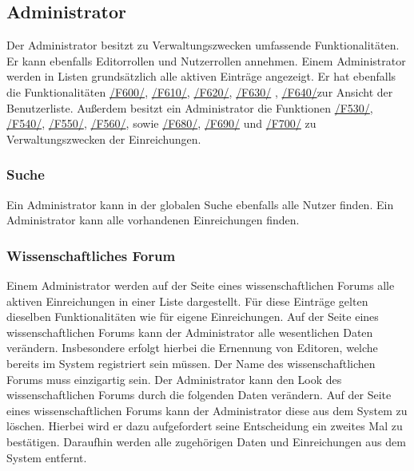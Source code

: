 \subsection{Administrator}
Der Administrator besitzt zu Verwaltungszwecken umfassende Funktionalitäten. Er kann ebenfalls Editorrollen und Nutzerrollen annehmen.
Einem Administrator werden in Listen grundsätzlich alle aktiven Einträge angezeigt. Er hat ebenfalls die Funktionalitäten
\hyperref[funkt:600]{/F600/}, \hyperref[funkt:610]{/F610/}, \hyperref[funkt:620]{/F620/}, \hyperref[funkt:630]{/F630/}
, \hyperref[funkt:640]{/F640/}zur Ansicht der Benutzerliste.
Außerdem besitzt ein Administrator die Funktionen \hyperref[funkt:530]{/F530/}, \hyperref[funkt:540]{/F540/},
\hyperref[funkt:550]{/F550/}, \hyperref[funkt:560]{/F560/}, sowie \hyperref[funkt:680]{/F680/}, \hyperref[funkt:690]{/F690/} und
\hyperref[funkt:700]{/F700/}
zu Verwaltungszwecken der Einreichungen.

\subsubsection{Suche}
\begin{description}
     Ein Administrator kann in der globalen Suche ebenfalls alle Nutzer finden.
     Ein Administrator kann alle vorhandenen Einreichungen finden.
\end{description}

\subsubsection{Wissenschaftliches Forum}
\begin{description}
     Einem Administrator werden auf der Seite eines wissenschaftlichen Forums
    alle aktiven Einreichungen in einer Liste dargestellt.
    Für diese Einträge gelten dieselben Funktionalitäten wie für eigene Einreichungen. %
     Auf der Seite eines wissenschaftlichen Forums kann der Administrator alle wesentlichen Daten
    verändern. Insbesondere erfolgt hierbei die Ernennung von Editoren, welche bereits im System
    registriert sein  müssen. Der Name des wissenschaftlichen Forums muss einzigartig sein.
     Der Administrator kann den Look des wissenschaftlichen Forums durch die folgenden Daten
    verändern. %
     Auf der Seite eines wissenschaftlichen Forums kann der Administrator diese aus dem System zu löschen.
    Hierbei wird er dazu aufgefordert seine Entscheidung ein zweites Mal zu bestätigen.
    Daraufhin werden alle zugehörigen Daten
    und Einreichungen aus dem System entfernt. %
\end{description}

